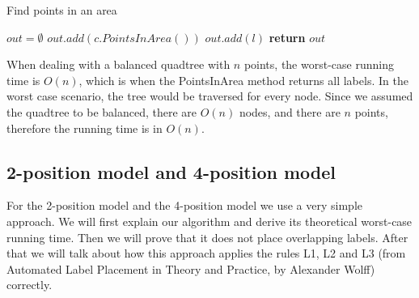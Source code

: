 \documentclass[crop=false,a4paper,oneside,11pt]{article}
\begin{document}
\begin{algorithm}[H]
\caption{Find points in an area}
\begin{algorithmic}[1]
\State $out = \emptyset$
\State $out.add(c.PointsInArea())$
\EndIf
\EndFor
\Else{}
\State $out.add(l)$
\EndIf
\EndFor
\EndIf
\State \textbf{return} $out$
\EndProcedure
\end{algorithmic}
\end{algorithm}

When dealing with a balanced quadtree with $n$ points, the worst-case running time is $O(n)$, which is when the PointsInArea method returns all labels. In the worst case scenario, the tree would be traversed for every node. Since we assumed the quadtree to be balanced, there are $O(n)$ nodes, and there are $n$ points, therefore the running time is in $O(n)$.

\subsection{2-position model and 4-position model}
For the 2-position model and the 4-position model we use a very simple approach. We will first explain our algorithm and derive its theoretical worst-case running time. Then we will prove that it does not place overlapping labels. After that we will talk about how this approach applies the rules L1, L2 and L3 (from Automated Label Placement in Theory and Practice, by Alexander Wolff) correctly.
\end{document}
